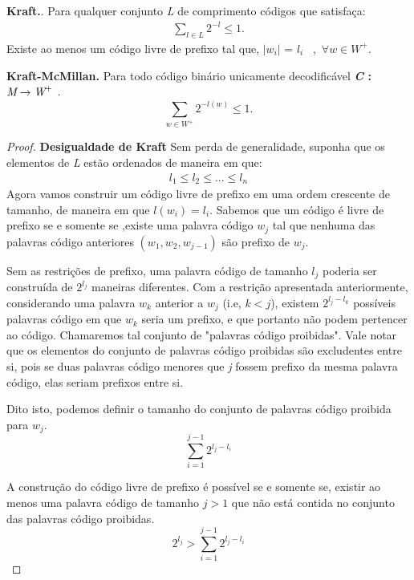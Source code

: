 \begin{lemma} 
\textbf{Kraft.}. Para qualquer conjunto \emph{L} de comprimento códigos que satisfaça:
\begin{align*}
\sum_{l \in L}^{} 2^{-l} \leq 1.
\end{align*}
Existe ao menos um código livre de prefixo tal que, $|w_i|$ = $l_i$ ~,~$\forall w \in W^+$.

\textbf{Kraft-McMillan.} Para todo código binário unicamente decodificável \textbf{\emph{C} : $\emph{M} \rightarrow \emph{W}^+$} .
\begin{equation*}
\sum_{w \in W^+}^{}2^{-l(w)} \leq 1.
\end{equation*}


\begin{proof}

\item \textbf{Desigualdade de Kraft}
Sem perda de generalidade, suponha que os elementos de \emph{L} estão ordenados de maneira em que:
\begin{align*}
l_1 \leq l_2 \leq ... \leq l_n
\end{align*}
Agora vamos construir um código livre de prefixo em uma ordem crescente de tamanho, de maneira em que $l(w_i) = l_i$. Sabemos que um código é livre de prefixo se e somente se ,existe uma palavra código $w_j$  tal que nenhuma das palavras código anteriores $(w_1, w_2, w_{j-1})$ são prefixo de $w_j$.

Sem as restrições de prefixo, uma palavra código de tamanho $l_j$ poderia ser construída de $2^{l_j}$ maneiras diferentes. Com a restrição apresentada anteriormente, considerando uma palavra $w_k$ anterior a $w_j$ (i.e, $k < j$), existem $2^{l_j - l_k}$ possíveis palavras código em que $w_k$ seria um prefixo, e que portanto não podem pertencer ao código. Chamaremos tal conjunto de "palavras código proibidas". Vale notar que os elementos do conjunto de palavras código proibidas são excludentes entre si, pois se duas palavras código menores que \emph{j} fossem prefixo da mesma palavra código, elas seriam prefixos entre si. 

Dito isto, podemos definir o tamanho do conjunto de palavras código proibida para $w_j$.
\begin{equation*}
\sum_{i=1}^{j-1} 2^{l_j - l_i}
\end{equation*}

A construção do código livre de prefixo é possível se e somente se, existir ao menos uma palavra código de tamanho $j > 1$ que não está contida no conjunto das palavras código proibidas.
\begin{equation*}
2^{l_j} > \sum_{i=1}^{j-1} 2^{l_j - l_i}
\end{equation*}


\end{proof}
\end{lemma}
